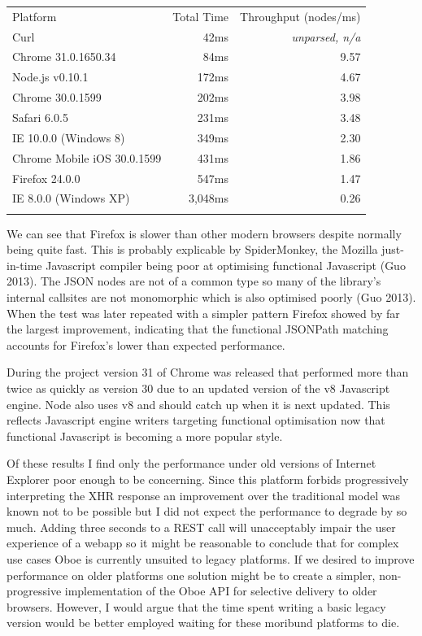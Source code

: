 \documentclass[12pt, ]{article}
\begin{document}
\begin{longtable}[c]{@{}lrr@{}}
\hline\noalign{\medskip}
Platform & Total Time & Throughput (nodes/ms)
\\\noalign{\medskip}
\hline\noalign{\medskip}
Curl & 42ms & \emph{unparsed, n/a}
\\\noalign{\medskip}
Chrome 31.0.1650.34 & 84ms & 9.57
\\\noalign{\medskip}
Node.js v0.10.1 & 172ms & 4.67
\\\noalign{\medskip}
Chrome 30.0.1599 & 202ms & 3.98
\\\noalign{\medskip}
Safari 6.0.5 & 231ms & 3.48
\\\noalign{\medskip}
IE 10.0.0 (Windows 8) & 349ms & 2.30
\\\noalign{\medskip}
Chrome Mobile iOS 30.0.1599 & 431ms & 1.86
\\\noalign{\medskip}
Firefox 24.0.0 & 547ms & 1.47
\\\noalign{\medskip}
IE 8.0.0 (Windows XP) & 3,048ms & 0.26
\\\noalign{\medskip}
\hline
\end{longtable}

We can see that Firefox is slower than other modern browsers despite
normally being quite fast. This is probably explicable by SpiderMonkey,
the Mozilla just-in-time Javascript compiler being poor at optimising
functional Javascript (Guo 2013). The JSON nodes are not of a common
type so many of the library's internal callsites are not monomorphic
which is also optimised poorly (Guo 2013). When the test was later
repeated with a simpler pattern Firefox showed by far the largest
improvement, indicating that the functional JSONPath matching accounts
for Firefox's lower than expected performance.

During the project version 31 of Chrome was released that performed more
than twice as quickly as version 30 due to an updated version of the v8
Javascript engine. Node also uses v8 and should catch up when it is next
updated. This reflects Javascript engine writers targeting functional
optimisation now that functional Javascript is becoming a more popular
style.

Of these results I find only the performance under old versions of
Internet Explorer poor enough to be concerning. Since this platform
forbids progressively interpreting the XHR response an improvement over
the traditional model was known not to be possible but I did not expect
the performance to degrade by so much. Adding three seconds to a REST
call will unacceptably impair the user experience of a webapp so it
might be reasonable to conclude that for complex use cases Oboe is
currently unsuited to legacy platforms. If we desired to improve
performance on older platforms one solution might be to create a
simpler, non-progressive implementation of the Oboe API for selective
delivery to older browsers. However, I would argue that the time spent
writing a basic legacy version would be better employed waiting for
these moribund platforms to die.
\end{document}

